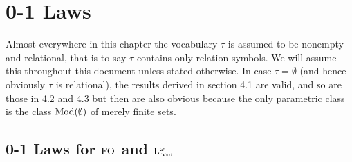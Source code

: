 \setcounter{chapter}{3}
\chapter{0-1 Laws}
Almost everywhere in this chapter the vocabulary $\tau$ is assumed to be nonempty and relational, that is to say $\tau$ contains only relation symbols. We will assume this throughout this document unless stated otherwise. In case $\tau = \emptyset$ (and hence obviously $\tau$ is relational), the results derived in section 4.1 are valid, and so are those in 4.2 and 4.3 but then are also obvious because the only parametric class is the class $\mathrm{Mod}(\emptyset)$ of merely finite sets.
\setcounter{section}{0}
\section{0-1 Laws for $\folog$ and $\inflog[\omega]$}
